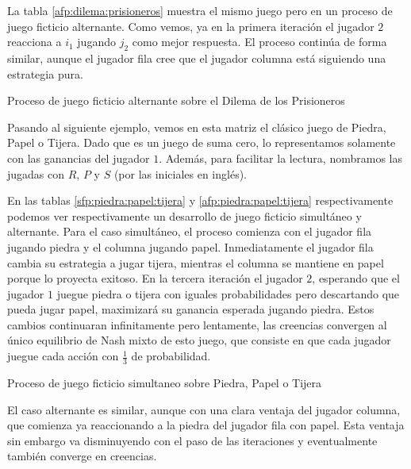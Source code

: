 La tabla \ref{afp:dilema:prisioneros} muestra el mismo juego pero en un proceso de juego ficticio alternante. Como vemos, ya en la primera iteración el jugador $2$ reacciona a $i_1$ jugando $j_2$ como mejor respuesta. El proceso continúa de forma similar, aunque el jugador fila cree que el jugador columna está siguiendo una estrategia pura.

\begin{table} %
    \centering
    
    \caption{Proceso de juego ficticio alternante sobre el Dilema de los Prisioneros}
    \label{afp:dilema:prisioneros}
\end{table}

Pasando al siguiente ejemplo, vemos en esta matriz el clásico juego de Piedra, Papel o Tijera. Dado que es un juego de suma cero, lo representamos solamente con las ganancias del jugador $1$. Además, para facilitar la lectura, nombramos las jugadas con $R$, $P$ y $S$ (por las iniciales en inglés).



En las tablas \ref{sfp:piedra:papel:tijera} y \ref{afp:piedra:papel:tijera} respectivamente podemos ver respectivamente un desarrollo de juego ficticio simultáneo y alternante. Para el caso simultáneo, el proceso comienza con el jugador fila jugando piedra y el columna jugando papel. Inmediatamente el jugador fila cambia su estrategia a jugar tijera, mientras el columna se mantiene en papel porque lo proyecta exitoso. En la tercera iteración el jugador $2$, esperando que el jugador $1$ juegue piedra o tijera con iguales probabilidades pero descartando que pueda jugar papel, maximizará su ganancia esperada jugando piedra. Estos cambios continuaran infinitamente pero lentamente, las creencias convergen al único equilibrio de Nash mixto de esto juego, que consiste en que cada jugador juegue cada acción con $\frac{1}{3}$ de probabilidad. 

\begin{table} %
    \centering
    
    \caption{Proceso de juego ficticio simultaneo sobre Piedra, Papel o Tijera}
    \label{sfp:piedra:papel:tijera}
\end{table}

El caso alternante es similar, aunque con una clara ventaja del jugador columna, que comienza ya reaccionando a la piedra del jugador fila con papel. Esta ventaja sin embargo va disminuyendo con el paso de las iteraciones y eventualmente también converge en creencias.


